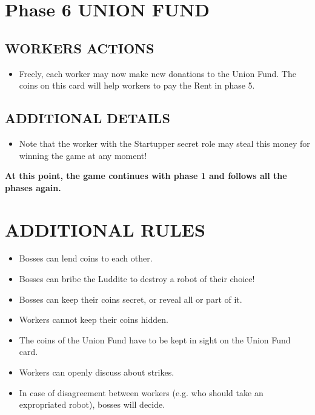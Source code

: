 \section{Phase 6 UNION FUND}

    \subsection{WORKERS ACTIONS}

        \begin{itemize}
            \item Freely, each worker may now make new donations to the Union Fund. The
            coins on this card will help workers to pay the Rent in phase 5.
        \end{itemize}
    
    \subsection{ADDITIONAL DETAILS}

        \begin{itemize}
            \item Note that the worker with the Startupper secret role may steal this money for
            winning the game at any moment!
        \end{itemize}

        \textbf{At this point, the game continues with phase 1 and follows all the phases
        again.}

\section{ADDITIONAL RULES}

    \begin{itemize}
        \item Bosses can lend coins to each other.
        \item Bosses can bribe the Luddite to destroy a robot of their choice!
        \item Bosses can keep their coins secret, or reveal all or part of it.
        \item Workers cannot keep their coins hidden.
        \item The coins of the Union Fund have to be kept in sight on the Union Fund card.
        \item Workers can openly discuss about strikes.
        \item In case of disagreement between workers (e.g. who should take an expropriated
        robot), bosses will decide.
    \end{itemize}


